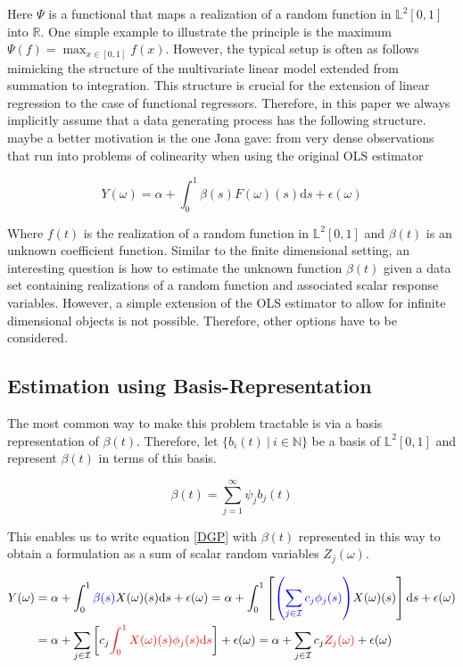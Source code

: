 \documentclass[11pt,twoside,a4paper]{article}
\begin{document}
	Here $\Psi$ is a functional that maps a realization of a random function in $\mathbb{L}^2[0,1]$ into $\mathbb{R}$. One simple example to illustrate the principle is the maximum $\Psi(f) = \max_{x \in [0,1]}f(x)$.
	However, the typical setup is often as follows mimicking the structure of the multivariate linear model extended from summation to integration. This structure is crucial for the extension of linear regression to the case of functional regressors. Therefore, in this paper we always implicitly assume that a data generating process has the following structure. {\color{red} maybe a better motivation is the one Jona gave: from very dense observations that run into problems of colinearity when using the original OLS estimator}
	
	\begin{equation}\label{DGP}
		Y(\omega) = \alpha + \int_{0}^{1} \beta(s)F(\omega)(s) \mathrm{d}s + \epsilon(\omega)
	\end{equation}
	
	Where $f(t)$ is the realization of a random function in $\mathbb{L}^2[0,1]$ and $\beta(t)$ is an unknown coefficient function. 
	Similar to the finite dimensional setting, an interesting question is how to estimate the unknown function $\beta(t)$ given a data set containing realizations of a random function and associated scalar response variables. However, a simple extension of the OLS estimator to allow for infinite dimensional objects is not possible. Therefore, other options have to be considered.
	
	\subsection{Estimation using Basis-Representation}
	The most common way to make this problem tractable is via a basis representation of $\beta(t)$. Therefore, let $\{b_i(t) \: \vert \: i \in \mathbb{N}\}$ be a basis of $\mathbb{L}^2[0,1]$ and represent $\beta(t)$ in terms of this basis.
	
	\begin{equation}
		\beta(t) = \sum_{j = 1}^{\infty} \psi_j b_j(t)
	\end{equation}
	
	This enables us to write equation \ref{DGP} with $\beta(t)$ represented in this way to obtain a formulation as a sum of scalar random variables $Z_j(\omega)$.
	
	\begin{equation}
		\begin{split}
			Y(\omega) & = \alpha + \int_{0}^{1} {\color{blue}\beta(s)} X(\omega)(s)\mathrm{d}s + \epsilon(\omega)
			= \alpha + \int_{0}^{1}\left[{\color{blue}\left(\sum_{j \in \mathcal{I}} c_j \phi_j(s)\right)} X(\omega)(s) \right]\mathrm{d}s + \epsilon(\omega) \\
			& = \alpha + \sum_{j \in \mathcal{I}} \left[c_j \textcolor{red}{\int_{0}^{1} X(\omega)(s) \phi_j(s)\mathrm{d}s}\right] + \epsilon(\omega)
		      = \alpha + \sum_{j \in \mathcal{I}} c_j \textcolor{red}{Z_j(\omega)} + \epsilon(\omega)
		\end{split}
	\end{equation}
	
\end{document}
